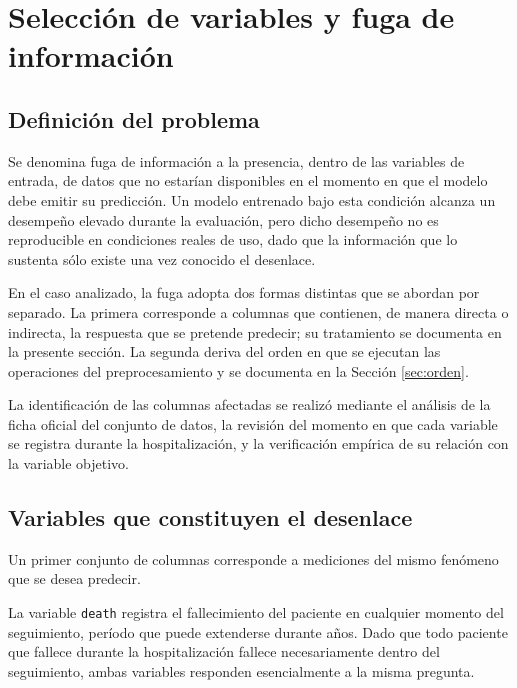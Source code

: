 \documentclass[11pt]{article}
\begin{document}
\section{Selección de variables y fuga de información}
\label{sec:fuga}

\subsection{Definición del problema}

Se denomina fuga de información a la presencia, dentro de las variables de entrada, de datos que
no estarían disponibles en el momento en que el modelo debe emitir su predicción. Un modelo
entrenado bajo esta condición alcanza un desempeño elevado durante la evaluación, pero dicho
desempeño no es reproducible en condiciones reales de uso, dado que la información que lo
sustenta sólo existe una vez conocido el desenlace.

En el caso analizado, la fuga adopta dos formas distintas que se abordan por separado. La primera
corresponde a columnas que contienen, de manera directa o indirecta, la respuesta que se pretende
predecir; su tratamiento se documenta en la presente sección. La segunda deriva del orden en que
se ejecutan las operaciones del preprocesamiento y se documenta en la Sección \ref{sec:orden}.

La identificación de las columnas afectadas se realizó mediante el análisis de la ficha oficial
del conjunto de datos, la revisión del momento en que cada variable se registra durante la
hospitalización, y la verificación empírica de su relación con la variable objetivo.

\subsection{Variables que constituyen el desenlace}

Un primer conjunto de columnas corresponde a mediciones del mismo fenómeno que se desea predecir.

La variable \texttt{death} registra el fallecimiento del paciente en cualquier momento del
seguimiento, período que puede extenderse durante años. Dado que todo paciente que fallece durante
la hospitalización fallece necesariamente dentro del seguimiento, ambas variables responden
esencialmente a la misma pregunta.
\end{document}
